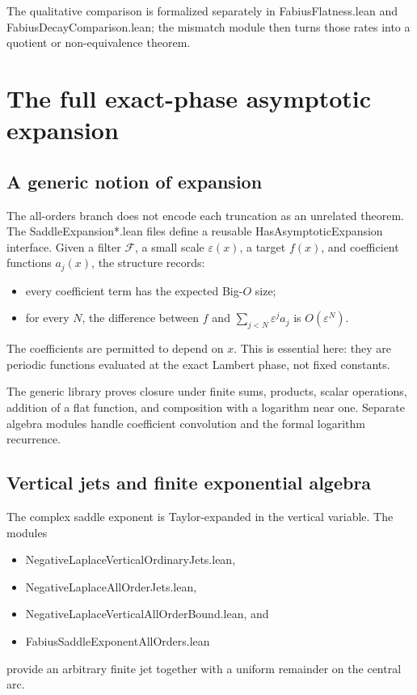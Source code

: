 \documentclass[11pt,a4paper,openany]{book}
\def\module#1{#1.lean}
\def\decl#1{#1}
\newcommand{\module}[1]{\nolinkurl{#1.lean}}
\newcommand{\decl}[1]{\texttt{\detokenize{#1}}}
\begin{document}
The qualitative comparison is formalized separately in
\module{FabiusFlatness} and \module{FabiusDecayComparison}; the mismatch module
then turns those rates into a quotient or non-equivalence theorem.

\chapter{The full exact-phase asymptotic expansion}
\label{ch:all-orders}

\section{A generic notion of expansion}
The all-orders branch does not encode each truncation as an unrelated theorem.
The \module{SaddleExpansion*} files define a reusable
\decl{HasAsymptoticExpansion} interface.  Given a filter $\mathcal F$, a small
scale $\varepsilon(x)$, a target $f(x)$, and coefficient functions $a_j(x)$,
the structure records:
\begin{itemize}
  \item every coefficient term has the expected Big-$O$ size;
  \item for every $N$, the difference between $f$ and
        $\sum_{j<N}\varepsilon^j a_j$ is $O(\varepsilon^N)$.
\end{itemize}
The coefficients are permitted to depend on $x$.  This is essential here:
they are periodic functions evaluated at the exact Lambert phase, not fixed
constants.

The generic library proves closure under finite sums, products, scalar
operations, addition of a flat function, and composition with a logarithm near
one.  Separate algebra modules handle coefficient convolution and the formal
logarithm recurrence.

\section{Vertical jets and finite exponential algebra}
The complex saddle exponent is Taylor-expanded in the vertical variable.  The
modules
\begin{itemize}
  \item \module{NegativeLaplaceVerticalOrdinaryJets},
  \item \module{NegativeLaplaceAllOrderJets},
  \item \module{NegativeLaplaceVerticalAllOrderBound}, and
  \item \module{FabiusSaddleExponentAllOrders}
\end{itemize}
provide an arbitrary finite jet together with a uniform remainder on the
central arc.
\end{document}
